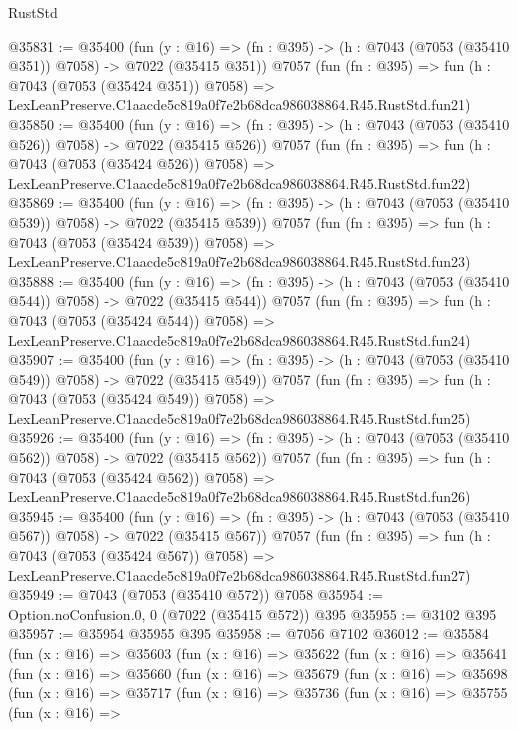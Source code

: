 \begin{lexlean}{RustStd}
\begin{coremodule}
@35831 := @35400
    (fun (y : @16) => (fn : @395) -> (h : @7043 (@7053 (@35410 @351)) @7058) -> @7022 (@35415 @351))
    @7057
    (fun (fn : @395) =>
    fun (h : @7043 (@7053 (@35424 @351)) @7058) =>
    LexLeanPreserve.C1aacde5c819a0f7e2b68dca986038864.R45.RustStd.fun21)
@35850 := @35400
    (fun (y : @16) => (fn : @395) -> (h : @7043 (@7053 (@35410 @526)) @7058) -> @7022 (@35415 @526))
    @7057
    (fun (fn : @395) =>
    fun (h : @7043 (@7053 (@35424 @526)) @7058) =>
    LexLeanPreserve.C1aacde5c819a0f7e2b68dca986038864.R45.RustStd.fun22)
@35869 := @35400
    (fun (y : @16) => (fn : @395) -> (h : @7043 (@7053 (@35410 @539)) @7058) -> @7022 (@35415 @539))
    @7057
    (fun (fn : @395) =>
    fun (h : @7043 (@7053 (@35424 @539)) @7058) =>
    LexLeanPreserve.C1aacde5c819a0f7e2b68dca986038864.R45.RustStd.fun23)
@35888 := @35400
    (fun (y : @16) => (fn : @395) -> (h : @7043 (@7053 (@35410 @544)) @7058) -> @7022 (@35415 @544))
    @7057
    (fun (fn : @395) =>
    fun (h : @7043 (@7053 (@35424 @544)) @7058) =>
    LexLeanPreserve.C1aacde5c819a0f7e2b68dca986038864.R45.RustStd.fun24)
@35907 := @35400
    (fun (y : @16) => (fn : @395) -> (h : @7043 (@7053 (@35410 @549)) @7058) -> @7022 (@35415 @549))
    @7057
    (fun (fn : @395) =>
    fun (h : @7043 (@7053 (@35424 @549)) @7058) =>
    LexLeanPreserve.C1aacde5c819a0f7e2b68dca986038864.R45.RustStd.fun25)
@35926 := @35400
    (fun (y : @16) => (fn : @395) -> (h : @7043 (@7053 (@35410 @562)) @7058) -> @7022 (@35415 @562))
    @7057
    (fun (fn : @395) =>
    fun (h : @7043 (@7053 (@35424 @562)) @7058) =>
    LexLeanPreserve.C1aacde5c819a0f7e2b68dca986038864.R45.RustStd.fun26)
@35945 := @35400
    (fun (y : @16) => (fn : @395) -> (h : @7043 (@7053 (@35410 @567)) @7058) -> @7022 (@35415 @567))
    @7057
    (fun (fn : @395) =>
    fun (h : @7043 (@7053 (@35424 @567)) @7058) =>
    LexLeanPreserve.C1aacde5c819a0f7e2b68dca986038864.R45.RustStd.fun27)
@35949 := @7043 (@7053 (@35410 @572)) @7058
@35954 := Option.noConfusion.{0, 0} (@7022 (@35415 @572)) @395
@35955 := @3102 @395
@35957 := @35954 @35955 @395
@35958 := @7056 @7102
@36012 := @35584
    (fun (x : @16) =>
    @35603
      (fun (x : @16) =>
      @35622
        (fun (x : @16) =>
        @35641
          (fun (x : @16) =>
          @35660
            (fun (x : @16) =>
            @35679
              (fun (x : @16) =>
              @35698
                (fun (x : @16) =>
                @35717
                  (fun (x : @16) =>
                  @35736
                    (fun (x : @16) =>
                    @35755
                      (fun (x : @16) =>

\end{coremodule}
\end{lexlean}
